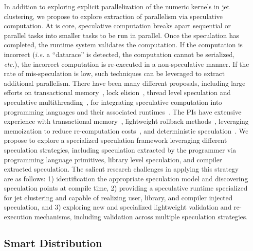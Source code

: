 \documentclass[12pt]{article}
\begin{document}
In addition to exploring explicit parallelization of the numeric kernels in jet clustering, we
propose to explore extraction of parallelism via speculative computation. At is core, speculative
computation breaks apart sequential or parallel tasks into smaller tasks to be run in parallel. Once
the speculation has completed, the runtime system validates the computation. If the computation is
incorrect ({\em i.e.} a ``datarace'' is detected, the computation cannot be serialized, {\em etc.}), the
incorrect computation is re-executed in a non-speculative manner.  If the rate of mis-speculation
is low, such techniques can be leveraged to extract additional parallelism. There have been many different
proposals, including large efforts on transactional memory~\cite{}, lock elision~\cite{}, thread level speculation and speculative
multithreading~\cite{},
 for integrating speculative computation into programming languages and their associated runtimes~\cite{}.
The PIs have extensive experience with transactional memory~\cite{trans}, lightweight rollback methods~\cite{stab}, 
leveraging memoization to reduce re-computation costs~\cite{memo1, memo2},
and deterministic speculation~\cite{iso}. We propose to explore a specialized speculation framework leveraging different
speculation strategies, including speculation extracted by the programmer via programming language primitives,
library level speculation, and compiler extracted speculation.
The salient research
challenges in applying this strategy are as follows:  1) identification the appropriate speculation model and
discovering speculation points at compile time, 2) providing a speculative runtime specialized for jet clustering
and capable of realizing user, library, and compiler injected speculation, and 3) exploring new and specialized
lightweight validation and re-execution mechanisms, including validation across multiple speculation strategies.




\subsection{Smart Distribution}


{}
%
\end{document}
